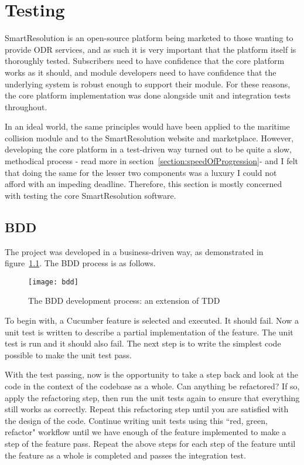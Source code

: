 \chapter{Testing}

SmartResolution is an open-source platform being marketed to those wanting to provide ODR services, and as such it is very important that the platform itself is thoroughly tested. Subscribers need to have confidence that the core platform works as it should, and module developers need to have confidence that the underlying system is robust enough to support their module. For these reasons, the core platform implementation was done alongside unit and integration tests throughout.

In an ideal world, the same principles would have been applied to the maritime collision module and to the SmartResolution website and marketplace. However, developing the core platform in a test-driven way turned out to be quite a slow, methodical process - read more in section~\ref{section:speedOfProgression}- and I felt that doing the same for the lesser two components was a luxury I could not afford with an impeding deadline. Therefore, this section is mostly concerned with testing the core SmartResolution software.

\section{BDD}

The project was developed in a business-driven way, as demonstrated in figure~\ref{uml:bdd}. The BDD process is as follows.

\begin{figure}[h!]
  \centering
    \ifimages
    \texttt{[image: bdd]}
    \fi
  \caption{The BDD development process: an extension of TDD}
  \label{uml:bdd}
\end{figure}

To begin with, a Cucumber feature is selected and executed. It should fail. Now a unit test is written to describe a partial implementation of the feature. The unit test is run and it should also fail. The next step is to write the simplest code possible to make the unit test pass.

With the test passing, now is the opportunity to take a step back and look at the code in the context of the codebase as a whole. Can anything be refactored? If so, apply the refactoring step, then run the unit tests again to ensure that everything still works as correctly. Repeat this refactoring step until you are satisfied with the design of the code. Continue writing unit tests using this ``red, green, refactor" workflow until we have enough of the feature implemented to make a step of the feature pass. Repeat the above steps for each step of the feature until the feature as a whole is completed and passes the integration test.

